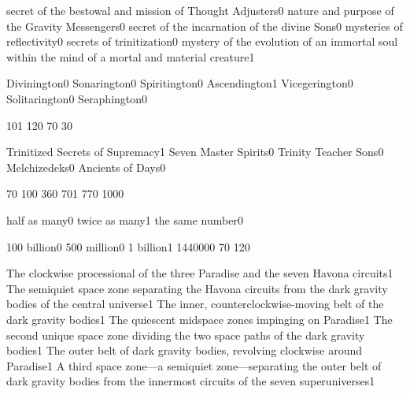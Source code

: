 {secret of the bestowal and mission of Thought Adjusters}{0}
{nature and purpose of the Gravity Messengers}{0}
{secret of the incarnation of the divine Sons}{0}
{mysteries of reflectivity}{0}
{secrets of trinitization}{0}
{mystery of the evolution of an immortal soul within the mind of a mortal and material creature}{1}
\qstop

{Divinington}{0}
{Sonarington}{0}
{Spiritington}{0}
{Ascendington}{1}
{Vicegerington}{0}
{Solitarington}{0}
{Seraphington}{0}
\qstop

{10}{1}
{12}{0}
{7}{0}
{3}{0}
\qstop

{Trinitized Secrets of Supremacy}{1}
{Seven Master Spirits}{0}
{Trinity Teacher Sons}{0}
{Melchizedeks}{0}
{Ancients of Days}{0}
\qstop


{7}{0}
{10}{0}
{36}{0}
{70}{1}
{77}{0}
{100}{0}
\qstop

{half as many}{0}
{twice as many}{1}
{the same number}{0}
\qstop

{100 billion}{0}
{500 million}{0}
{1 billion}{1}
{144000}{0}
{7}{0}
{12}{0}
\qstop

{The clockwise processional of the three Paradise and the seven Havona circuits}{1}
{The semiquiet space zone separating the Havona circuits from the dark gravity bodies of the central universe}{1}
{The inner, counterclockwise-moving belt of the dark gravity bodies}{1}
{The quiescent midspace zones impinging on Paradise}{1}
{The second unique space zone dividing the two space paths of the dark gravity bodies}{1}
{The outer belt of dark gravity bodies, revolving clockwise around Paradise}{1}
{A third space zone—a semiquiet zone—separating the outer belt of dark gravity bodies from the innermost circuits of the seven superuniverses}{1}
\qstop

